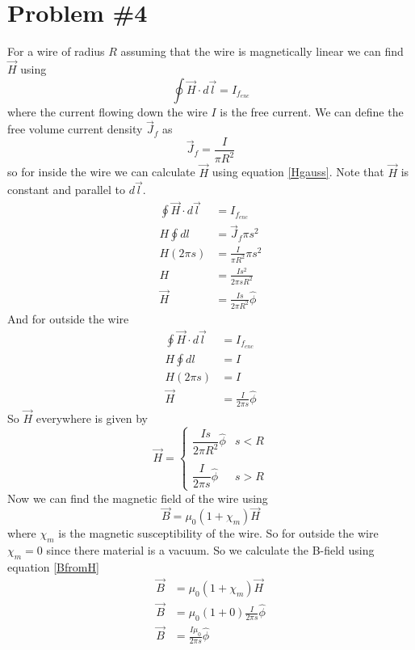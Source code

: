 \documentclass[11pt]{article}
\numberwithin{equation}{section}
\begin{document}
\section{Problem \#4}
For a wire of radius $R$ assuming that the wire is magnetically linear we can find $\vec{H}$ using
\begin{equation}
\oint\vec{H}\cdot d\vec{l} = I_{f_{enc}}
\label{Hgauss}
\end{equation}
where the current flowing down the wire $I$ is the free current. We can define the free volume current density $\vec{J}_f$ as
$$\vec{J}_f = \frac{I}{\pi R^2}$$
so for inside the wire we can calculate $\vec{H}$ using equation \ref{Hgauss}. Note that $\vec{H}$ is constant and parallel to $d\vec{l}$.
\begin{align*}
\oint\vec{H}\cdot d\vec{l} &= I_{f_{enc}}\\
H\oint dl &= \vec{J}_f\pi s^2\\
H(2\pi s) &= \frac{I}{\pi R^2}\pi s^2\\
H &= \frac{Is^2}{2\pi sR^2}\\
\vec{H} &= \frac{Is}{2\pi R^2}\hat{\phi}
\end{align*}
And for outside the wire
\begin{align*}
\oint\vec{H}\cdot d\vec{l} &= I_{f_{enc}}\\
H\oint dl &= I\\
H(2\pi s) &= I\\
\vec{H} &= \frac{I}{2\pi s}\hat{\phi}
\end{align*}
So $\vec{H}$ everywhere is given by
$$\vec{H} = \left\{\begin{array}{lc}
	\dfrac{Is}{2\pi R^2}\hat{\phi}	&s<R\\
\\
 	\dfrac{I}{2\pi s}\hat{\phi}	&s>R
		\end{array}\right.$$
Now we can find the magnetic field of the wire using 
\begin{equation}
\vec{B} = \mu_0(1+\chi_m)\vec{H}
\label{BfromH}
\end{equation}
where $\chi_m$ is the magnetic susceptibility of the wire. So for outside the wire $\chi_m=0$ since there material is a vacuum. So we calculate the B-field using equation \ref{BfromH}
\begin{align*}
\vec{B} &= \mu_0(1+\chi_m)\vec{H}\\
\vec{B} &= \mu_0(1+0)\frac{I}{2\pi s}\hat{\phi}\\
\vec{B} &= \frac{I\mu_0}{2\pi s}\hat{\phi}
\end{align*}
\end{document}
